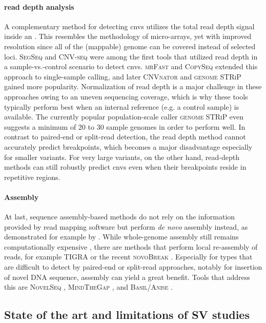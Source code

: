 \paragraph{read depth analysis}
A complementary method for detecting \acp{cnv} utilizes the total read depth
signal inside an \sv. This resembles the methodology of micro-arrays, yet with
improved resolution since all of the (mappable) genome can be covered instead
of selected loci. \textsc{SegSeq} \citep{Chiang2009} and \textsc{CNV-seq}
\citep{Xie2009} were among the first tools that utilized read depth in a
sample-vs.-control scenario to detect \acp{cnv}. \textsc{mrFast}
\citep{Alkan2009_mrFAST} and \textsc{CopySeq} \citep{Waszak2010} extended this
approach to single-sample \cnv calling, and later \textsc{CNVnator}
\citep{Abyzov2011} and \textsc{genome STRiP} \citep{Handsaker2015} gained more
popularity. Normalization of read depth is a major challenge in these approaches
owing to an uneven sequencing coverage, which is why these tools typically
perform best when an internal reference (e.g. a control sample) is available.
The currently popular population-scale \cnv caller \textsc{genome STRiP} even
suggests a minimum of 20 to 30 sample genomes in order to perform well. In
contrast to paired-end or split-read detection, the read depth method cannot
accurately predict breakpoints, which becomes a major disadvantage especially
for smaller variants. For very large variants, on the other hand, read-depth
methods can still robustly predict \acp{cnv} even when their breakpoints reside
in repetitive regions.

\paragraph{Assembly} At last, sequence assembly-based methods do not rely on the
information provided by read mapping software but perform \textit{de novo}
assembly instead, as demonstrated for example by .
While whole-genome assembly still remains computationally expensive
\citep{Bradnam2013}, there are methods that perform local re-assembly of reads,
for example \textsc{TIGRA} \citep{Chen2014b} or the recent \textsc{novoBreak}
\citep{Chong2017}. Especially for \sv types that are difficult to detect by
paired-end or split-read approaches, notably for insertion of novel DNA sequence,
assembly can yield a great benefit. Tools that address this are \textsc{NovelSeq}
\citep{Hajirasouliha2010}, \textsc{MindTheGap} \citep{Rizk2014}, and
\textsc{Basil/Anise} \citep{Holtgrewe2015}.


\subsection{State of the art and limitations of SV studies}
\label{sec:limitations}
